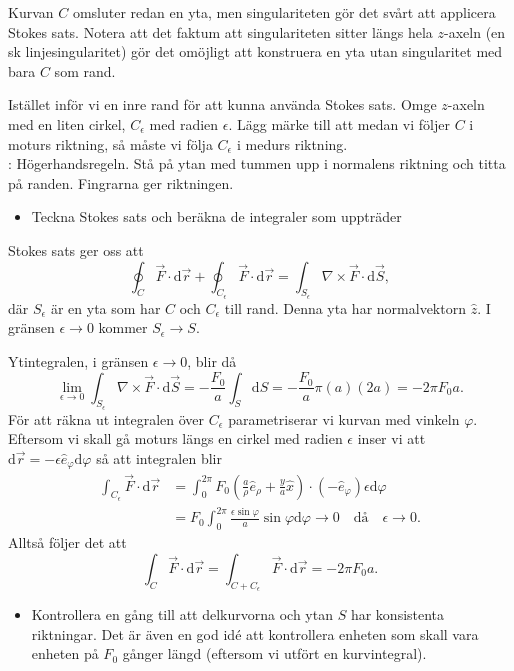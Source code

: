 \documentclass[%
oneside,                 %
final,                   %
10pt]{article}
\newcommand{\longinlinecomment}[3]{{\color{red}{\bf #1}: #2}}
\begin{document}
\noindent
Kurvan $C$ omsluter redan en yta, men singulariteten gör det svårt att applicera Stokes sats. Notera att det faktum att singulariteten sitter längs hela $z$-axeln (en sk linjesingularitet) gör det omöjligt att konstruera en yta utan singularitet med bara $C$ som rand.

Istället inför vi en inre rand för att kunna använda Stokes sats. Omge $z$-axeln med en liten cirkel, $C_\epsilon$ med radien $\epsilon$. Lägg märke till att medan vi följer $C$ i moturs riktning, så måste  vi följa $C_\epsilon$ i medurs riktning. \\
\longinlinecomment{Comment 1}{ Högerhandsregeln. Stå på ytan med tummen upp i normalens riktning och titta på randen. Fingrarna ger riktningen. }{ Högerhandsregeln. Stå på ytan } 
\begin{itemize}
\item Teckna Stokes sats och beräkna de integraler som uppträder
\end{itemize}

\noindent
Stokes sats ger oss att
\begin{equation}
  \oint_C \vec{F}\cdot \mbox{d}\vec{r} + \oint_{C_\epsilon} \vec{F}\cdot \mbox{d}\vec{r}
= \int_{S_\epsilon} \nabla \times \vec{F} \cdot \mbox{d}\vec{S},
\end{equation}
där $S_\epsilon$ är en yta som har $C$ och $C_\epsilon$ till rand.  Denna yta har 
normalvektorn $\hat{z}$. I gränsen $\epsilon \to 0$ kommer $S_\epsilon \to S$.

Ytintegralen, i gränsen $\epsilon \to 0$, blir då
\begin{equation}
  \lim_{\epsilon \to 0} \int_{S_\epsilon} \nabla \times \vec{F} \cdot \mbox{d}\vec{S} = -\frac{F_0}{a} \int_S \mbox{d}S
= - \frac{F_0}{a} \pi (a) (2a) = -2\pi F_0 a.
\end{equation}
För att räkna ut integralen över $C_\epsilon$ parametriserar vi kurvan med vinkeln $\varphi$. Eftersom vi skall gå moturs längs en cirkel med radien $\epsilon$ inser vi att $\mbox{d}\vec{r} = - \epsilon \hat{e}_\varphi \mbox{d}\varphi$ så att integralen blir
\begin{align}
  \int_{C_\epsilon} \vec{F}\cdot \mbox{d}\vec{r} &= \int_0^{2\pi} F_0 
\left(\frac{a}{\rho} \hat{e}_\rho + \frac{y}{a} \hat{x} \right) \cdot
\left(-\hat{e}_\varphi \right) \epsilon \mbox{d}\varphi \nonumber \\
&= F_0 \int_0^{2\pi} \frac{\epsilon \sin \varphi}{a} \sin
\varphi \mbox{d} \varphi \to 0 \quad \mbox{då} \quad \epsilon \to 0.
\end{align}
Alltså följer det att 
\begin{equation}
\int_C \vec{F} \cdot \mbox{d}\vec{r} = \int_{C+C_\epsilon} \vec{F}\cdot \mbox{d}\vec{r} =
-2\pi F_0 a.
\end{equation}
\begin{itemize}
\item Kontrollera en gång till att delkurvorna och ytan $S$ har konsistenta riktningar. Det är även en god idé att kontrollera enheten som skall vara enheten på $F_0$ gånger längd (eftersom vi utfört en kurvintegral).
\end{itemize}
\end{document}
